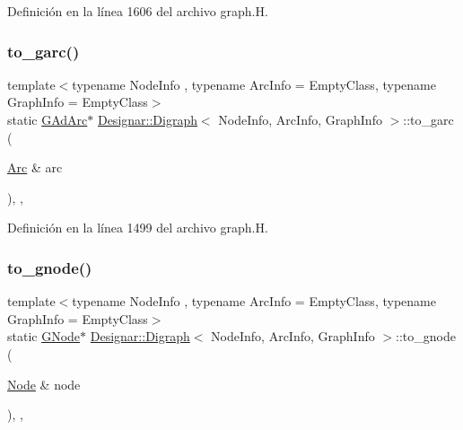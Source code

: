 Definición en la línea 1606 del archivo graph.\+H.

\mbox{\label{class_designar_1_1_digraph_a6137e6849dcb4208e9c8daa26f303868}} 
\subsubsection{\texorpdfstring{to\+\_\+garc()}{to\_garc()}}
{\footnotesize\ttfamily template$<$typename Node\+Info , typename Arc\+Info  = Empty\+Class, typename Graph\+Info  = Empty\+Class$>$ \\
static \hyperlink{class_designar_1_1_digraph_a0c6d846f23d1e82556fb6055557df53f}{G\+Ad\+Arc}$\ast$ \hyperlink{class_designar_1_1_digraph}{Designar\+::\+Digraph}$<$ Node\+Info, Arc\+Info, Graph\+Info $>$\+::to\+\_\+garc (\begin{DoxyParamCaption}\item[{\hyperlink{class_designar_1_1_digraph_a0ceb278671f2a535c00fddccdeafd69f}{Arc} \&}]{arc }\end{DoxyParamCaption})\hspace{0.3cm}{\ttfamily [inline]}, {\ttfamily [static]}, {\ttfamily [protected]}}



Definición en la línea 1499 del archivo graph.\+H.

\mbox{\label{class_designar_1_1_digraph_ae0a945e347e8e6a15df21df4fe2c1782}} 
\subsubsection{\texorpdfstring{to\+\_\+gnode()}{to\_gnode()}}
{\footnotesize\ttfamily template$<$typename Node\+Info , typename Arc\+Info  = Empty\+Class, typename Graph\+Info  = Empty\+Class$>$ \\
static \hyperlink{class_designar_1_1_digraph_a33b0d2b8820ada501522b0e67e63524a}{G\+Node}$\ast$ \hyperlink{class_designar_1_1_digraph}{Designar\+::\+Digraph}$<$ Node\+Info, Arc\+Info, Graph\+Info $>$\+::to\+\_\+gnode (\begin{DoxyParamCaption}\item[{\hyperlink{class_designar_1_1_digraph_a4dc921c41a480b7946a04170e997d8ae}{Node} \&}]{node }\end{DoxyParamCaption})\hspace{0.3cm}{\ttfamily [inline]}, {\ttfamily [static]}, {\ttfamily [protected]}}



